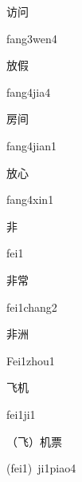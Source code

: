 \begin{verbete}{访问}
\begin{pronuncia}{fang3wen4}
\end{pronuncia}
\end{verbete}

\begin{verbete}{放假}
\begin{pronuncia}{fang4jia4}
\end{pronuncia}
\end{verbete}

\begin{verbete}{房间}
\begin{pronuncia}{fang4jian1}
\end{pronuncia}
\end{verbete}

\begin{verbete}{放心}
\begin{pronuncia}{fang4xin1}
\end{pronuncia}
\end{verbete}

\begin{verbete}[fei1]{非}
\begin{pronuncia}{fei1}
\end{pronuncia}
\end{verbete}

\begin{verbete}{非常}
\begin{pronuncia}{fei1chang2}
\end{pronuncia}
\end{verbete}

\begin{verbete}{非洲}
\begin{pronuncia}{Fei1zhou1}
\end{pronuncia}
\end{verbete}

\begin{verbete}[fei1ji1]{飞机}
\begin{pronuncia}{fei1ji1}
\end{pronuncia}
\end{verbete}

\begin{verbete}{（飞）机票}
\begin{pronuncia}{(fei1)\ ji1piao4}
\end{pronuncia}
\end{verbete}

